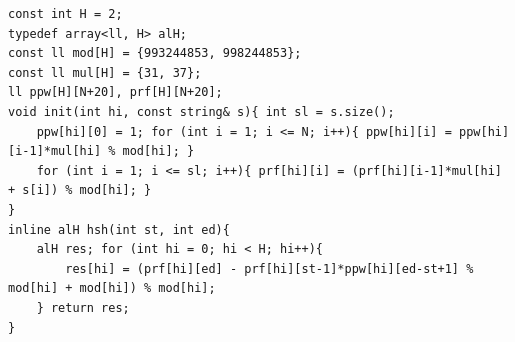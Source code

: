 \begin{verbatim}
const int H = 2;
typedef array<ll, H> alH;
const ll mod[H] = {993244853, 998244853};
const ll mul[H] = {31, 37};
ll ppw[H][N+20], prf[H][N+20];
void init(int hi, const string& s){ int sl = s.size();
	ppw[hi][0] = 1; for (int i = 1; i <= N; i++){ ppw[hi][i] = ppw[hi][i-1]*mul[hi] % mod[hi]; }
	for (int i = 1; i <= sl; i++){ prf[hi][i] = (prf[hi][i-1]*mul[hi] + s[i]) % mod[hi]; }
}
inline alH hsh(int st, int ed){
	alH res; for (int hi = 0; hi < H; hi++){
		res[hi] = (prf[hi][ed] - prf[hi][st-1]*ppw[hi][ed-st+1] % mod[hi] + mod[hi]) % mod[hi];
	} return res;
}
\end{verbatim}